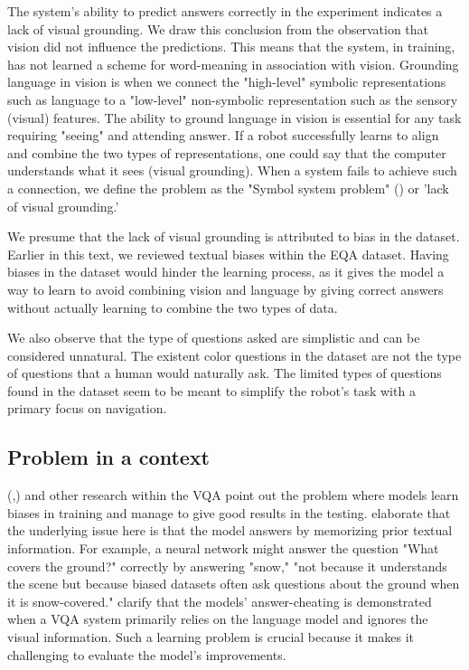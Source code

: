 The system's ability to predict answers correctly in the experiment indicates a lack of visual grounding. We draw this conclusion from the observation that vision did not influence the predictions. This means that the system, in training, has not learned a scheme for word-meaning in association with vision. Grounding language in vision is when we connect the "high-level" symbolic representations such as language to a "low-level" non-symbolic representation such as the sensory (visual) features. The ability to ground language in vision is essential for any task requiring "seeing" and attending answer. If a robot successfully learns to align and combine the two types of representations, one could say that the computer understands what it sees (visual grounding). When a system fails to achieve such a connection, we define the problem as the "Symbol system problem" (\cite{harnad1990symbol}) or 'lack of visual grounding.' 


We presume that the lack of visual grounding is attributed to bias in the dataset. Earlier in this text, we reviewed textual biases within the EQA dataset. Having biases in the dataset would hinder the learning process, as it gives the model a way to learn to avoid combining vision and language by giving correct answers without actually learning to combine the two types of data. 

We also observe that the type of questions asked are simplistic and can be considered unnatural. The existent color questions in the dataset are not the type of questions that a human would naturally ask. The limited types of questions found in the dataset seem to be meant to simplify the robot's task with a primary focus on navigation.


\subsection{Problem in a context}

(\cite{selvaraju2020squinting},\cite {goyal2017making}) and other research within the VQA point out the problem where models learn biases in training and manage to give good results in the testing.\cite{johnson2017clevr} elaborate that the underlying issue here is that the model answers by memorizing prior textual information. For example, a neural network might answer the question "What covers the ground?" correctly by answering "snow," "not because it understands the scene but because biased datasets often ask questions about the ground when it is snow-covered." \cite{fukui2016multimodal} clarify that the models' answer-cheating is demonstrated when a VQA system primarily relies on the language model and ignores the visual information. Such a learning problem is crucial because it makes it challenging to evaluate the model's improvements\cite{agrawal2018don}.

